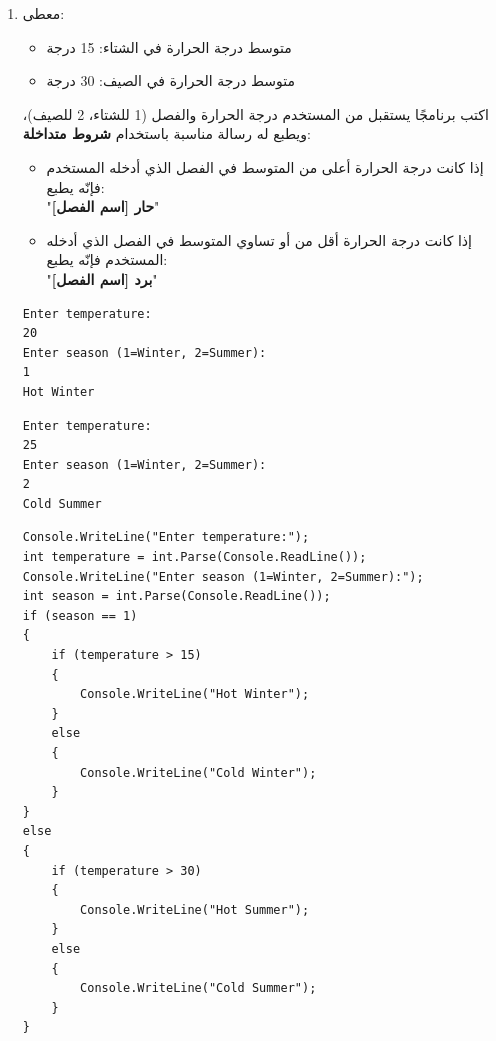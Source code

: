 \documentclass[14pt]{extarticle}
\begin{document}
\begin{enumerate}[resume, itemsep=2em]
\filbreak
\item
معطى:
\begin{itemize}
\item متوسط درجة الحرارة في الشتاء: 15 درجة
\item متوسط درجة الحرارة في الصيف: 30 درجة
\end{itemize}
اكتب برنامجًا يستقبل من المستخدم درجة الحرارة والفصل (1 للشتاء، 2 للصيف)، ويطبع له رسالة مناسبة باستخدام \textbf{شروط متداخلة}:
\begin{itemize}
\item إذا كانت درجة الحرارة أعلى من المتوسط في الفصل الذي أدخله المستخدم فإنّه يطبع: \\ "\textbf{حار [اسم الفصل]}"
\item إذا كانت درجة الحرارة أقل من أو تساوي المتوسط في الفصل الذي أدخله المستخدم فإنّه يطبع: \\ "\textbf{برد [اسم الفصل]}"
\end{itemize}
\ifdetailed
\begin{boxExample}[1]
\begin{english}
\begin{verbatim}
Enter temperature:
20
Enter season (1=Winter, 2=Summer):
1
Hot Winter
\end{verbatim}
\end{english}
\end{boxExample}
\begin{boxExample}[2]
\begin{english}
\begin{verbatim}
Enter temperature:
25
Enter season (1=Winter, 2=Summer):
2
Cold Summer
\end{verbatim}
\end{english}
\end{boxExample}
\fi
\ifwithsols
\begin{boxSolution}
\begin{english}
\begin{verbatim}
Console.WriteLine("Enter temperature:");
int temperature = int.Parse(Console.ReadLine());
Console.WriteLine("Enter season (1=Winter, 2=Summer):");
int season = int.Parse(Console.ReadLine());
if (season == 1)
{
    if (temperature > 15)
    {
        Console.WriteLine("Hot Winter");
    }
    else
    {
        Console.WriteLine("Cold Winter");
    }
}
else
{
    if (temperature > 30)
    {
        Console.WriteLine("Hot Summer");
    }
    else
    {
        Console.WriteLine("Cold Summer");
    }
}
\end{verbatim}
\end{english}
\end{boxSolution}
\fi


\end{enumerate}
\end{document}
